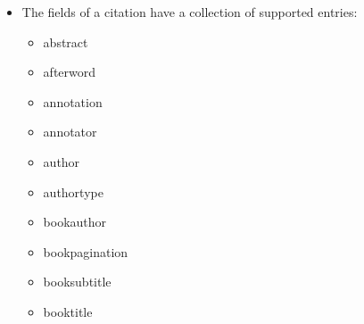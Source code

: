 \documentclass{article}
\begin{document}
\begin{itemize}
    \item The fields of a citation have a collection of supported entries:
    \begin{multicols}{4}
    \begin{itemize} \tt
        \item abstract
        \item afterword
        \item annotation
        \item annotator
        \item author
        \item authortype
        \item bookauthor
        \item bookpagination
        \item booksubtitle
        \item booktitle

\end{itemize}
\end{multicols}
\end{itemize}
\end{document}
